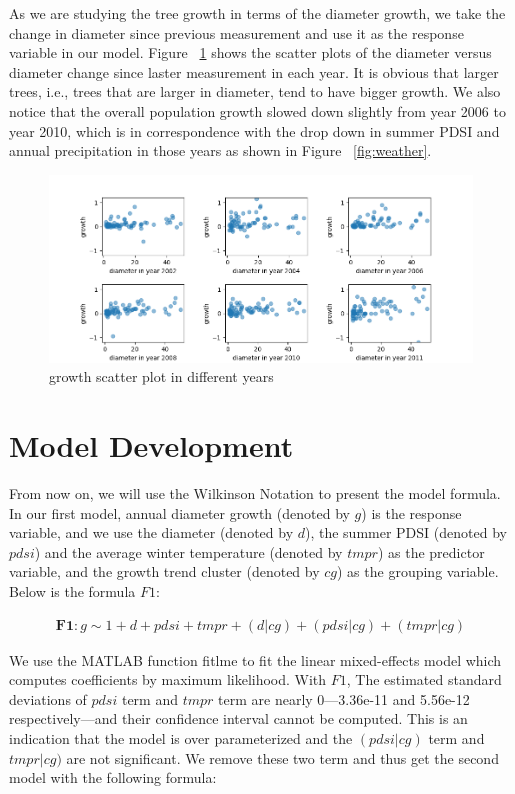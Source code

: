 \documentclass{article}
\begin{document}
As we are studying the tree growth in terms of the diameter growth, we take the change in diameter since previous measurement and use it as the response variable in our model. Figure ~\ref{fig:cm-diff-scatter} shows the scatter plots of the diameter versus diameter change since laster measurement in each year. It is obvious that larger trees, i.e., trees that are larger in diameter, tend to have bigger growth. We also notice that the overall population growth slowed down slightly from year 2006 to year 2010, which is in correspondence with the drop down in summer PDSI and annual precipitation in those years as shown in Figure ~\ref{fig:weather}.

\begin{figure}[h!]
    \centering
    \includegraphics[width=1\textwidth]{cm-diff-scatter.png}
    \caption{growth scatter plot in different years}
    \label{fig:cm-diff-scatter}
\end{figure}

\section*{Model Development}

From now on, we will use the Wilkinson Notation \cite{wilkinson} to present the model formula. In our first model, annual diameter growth (denoted by $g$) is the response variable, and we use the diameter (denoted by $d$), the summer PDSI (denoted by $pdsi$) and the average winter temperature (denoted by $tmpr$) as the predictor variable, and the growth trend cluster (denoted by $cg$) as the grouping variable. Below is the formula $F1$:

\begin{align*}
    \textbf{F1}: g\sim1+d+pdsi+tmpr+(d|cg)+(pdsi|cg)+(tmpr|cg)
\end{align*}

We use the MATLAB function fitlme \cite{workflow} to fit the linear mixed-effects model which computes coefficients by maximum likelihood. With $F1$, The estimated standard deviations of $pdsi$ term and $tmpr$ term are nearly 0---3.36e-11 and 5.56e-12 respectively---and their confidence interval cannot be computed. This is an indication that the model is over parameterized and the $(pdsi|cg)$  term and $tmpr|cg)$ are not significant. We remove these two term and thus get the second model with the following formula:
\end{document}
